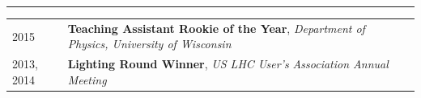 \documentclass{letter}
\begin{document}
\vspace{-10pt}

\begin{flushleft}
\Large{\textsc{\textbf{\color{Maroon}{Awards}}}}
\vspace{1pt} %
\hrule
\end{flushleft}

\begin{tabular}{p{}p{}}
	2015
	&
	\textbf{Teaching Assistant Rookie of the Year}, \textit{Department of Physics, University of Wisconsin} 
\\
	2013, 2014
	& 
	\textbf{Lighting Round Winner}, \textit{US LHC User's Association Annual Meeting}
\\
\end{tabular}
\end{document}
